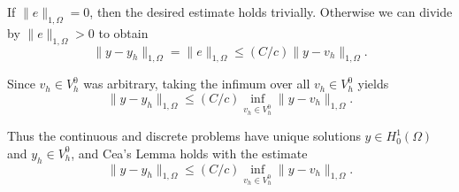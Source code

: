 \documentclass{article}
\begin{document}
If $\|e\|_{1,\Omega}=0$, then the desired estimate holds trivially. Otherwise we can divide by $\|e\|_{1,\Omega}>0$ to obtain
\[
\|y-y_h\|_{1,\Omega} = \|e\|_{1,\Omega} \le (C/c)\|y-v_h\|_{1,\Omega}.
\]

Since $v_h\in V_h^0$ was arbitrary, taking the infimum over all $v_h\in V_h^0$ yields
\[
\|y-y_h\|_{1,\Omega} \le (C/c) \inf_{v_h\in V_h^0} \|y-v_h\|_{1,\Omega}.
\]

Thus the continuous and discrete problems have unique solutions $y\in H^1_0(\Omega)$ and $y_h\in V_h^0$, and Cea's Lemma holds with the estimate
\[
\|y-y_h\|_{1,\Omega} \le (C/c)\inf_{v_h\in V_h^0}\|y-v_h\|_{1,\Omega}.
\]
\end{document}
